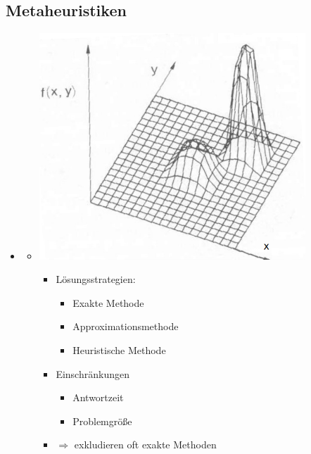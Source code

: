 \documentclass[
    12pt,
    a4paper,
    ngerman,
    color=3b,%
    marginpar=false,
    colorback=false,
    leqno,
]{tudaexercise}
\begin{document}
\subsection{Metaheuristiken}
    \begin{itemize}
        \item {}
            \begin{itemize}
                \item[]
                    \begin{minipage}{0.55\textwidth}
                        \includegraphics[width=10cm]{pictures/optimierungsproblem.PNG}
                    \end{minipage}
                    \begin{minipage}{0.4\textwidth}
                        \begin{itemize}
                            \item Lösungsstrategien:
                                \begin{itemize}
                                    \item Exakte Methode
                                    \item Approximationsmethode
                                    \item Heuristische Methode
                                \end{itemize}
                            \item Einschränkungen
                                \begin{itemize}
                                    \item Antwortzeit
                                    \item Problemgröße
                                \end{itemize}
                            \item[] $\Rightarrow$ exkludieren oft exakte Methoden
                        \end{itemize}
                    \end{minipage}
            \end{itemize}
        

\end{itemize}
\end{document}

